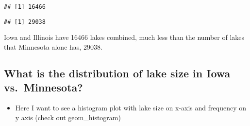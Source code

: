\documentclass[
]{book}
\newenvironment{Shaded}{\begin{snugshade}}{\end{snugshade}}
\newcommand{\FunctionTok}[1]{\textcolor[rgb]{0.00,0.00,0.00}{#1}}
\newcommand{\NormalTok}[1]{#1}
\newcommand{\OtherTok}[1]{\textcolor[rgb]{0.56,0.35,0.01}{#1}}
\newcommand{\SpecialCharTok}[1]{\textcolor[rgb]{0.00,0.00,0.00}{#1}}
\providecommand{\tightlist}{%
  \setlength{\itemsep}{0pt}\setlength{\parskip}{0pt}}
\begin{document}
\begin{verbatim}
## [1] 16466
\end{verbatim}

\begin{Shaded}
\end{Shaded}

\begin{verbatim}
## [1] 29038
\end{verbatim}

\begin{Shaded}
\end{Shaded}

Iowa and Illinois have 16466 lakes combined, much less than the number of lakes that Minnesota alone has, 29038.

\hypertarget{what-is-the-distribution-of-lake-size-in-iowa-vs.-minnesota}{%
\subsection{What is the distribution of lake size in Iowa vs.~Minnesota?}\label{what-is-the-distribution-of-lake-size-in-iowa-vs.-minnesota}}

\begin{itemize}
\tightlist
\item
  Here I want to see a histogram plot with lake size on x-axis and frequency on y axis (check out geom\_histogram)
\end{itemize}
\end{document}
